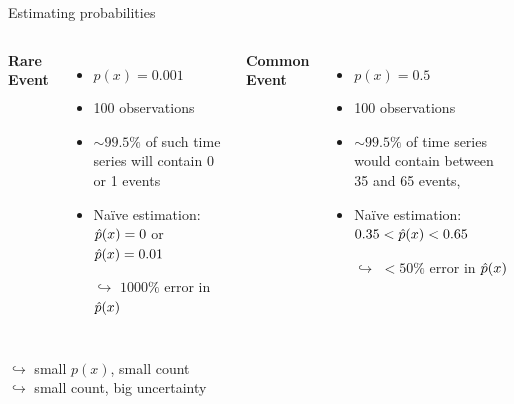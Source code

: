 \begin{frame}{Estimating probabilities}
\begin{columns}[T]
\textbf{Rare Event} %
\begin{itemize}
  \item $p(x) = 0.001$
  \item \num{100} observations
  \item $\sim 99.5\%$ of such time series will contain 0 or 1 events
  \item Na\"ive estimation: $\hat{p}(x) = 0$ or $\hat{p}(x)=0.01$
  \item[$\hookrightarrow$] $\num{1000}\%$ error in $\hat{p}(x)$ 
\end{itemize}
\textbf{Common Event} %
\begin{itemize}
  \item $p(x)=0.5$
  \item \num{100} observations
  \item $\sim 99.5\%$ of time series would contain between 35 and 65 events,
  \item Na\"ive estimation: $0.35< \hat{p}(x) <0.65$
  \item[]
  \item[$\hookrightarrow$] $< 50\%$ error in $\hat{p}(x)$
\end{itemize}
\end{columns}
\vspace{2em}
 \centering
$\hookrightarrow$ small $p(x)$, small count \\
$\hookrightarrow$ small count, big uncertainty
\end{frame}


